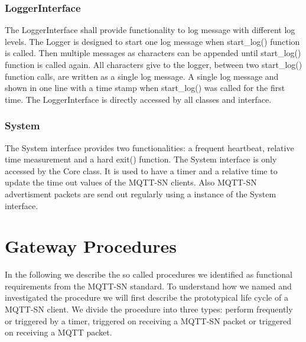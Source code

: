 \subsubsection{LoggerInterface}
The LoggerInterface shall provide functionality to log message with different log levels.
The Logger is designed to start one log message when start\_log() function is called.
Then multiple messages as characters can be appended until start\_log() function is called again.
All characters give to the logger, between two start\_log() function calls, are written as a single log message.
A single log message and shown in one line with a time stamp when start\_log() was called for the first time.
The LoggerInterface is directly accessed by all classes and interface.

\subsubsection{System}
The System interface provides two functionalities: a frequent heartbeat, relative time measurement and a hard exit() function.
The System interface is only accessed by the Core class.
It is used to have a timer and a relative time to update the time out values of the MQTT-SN clients.
Also MQTT-SN advertisment packets are send out regularly using a instance of the System interface.

\section{Gateway Procedures}\label{sec:gatewayprocedures}
In the following we describe the so called procedures we identified as functional requirements from the MQTT-SN standard.
To understand how we named and investigated the procedure we will first describe the prototypical life cycle of a MQTT-SN client.
We divide the procedure into three types: perform frequently or triggered by a timer, triggered on receiving a MQTT-SN packet or triggered on receiving a MQTT packet.
